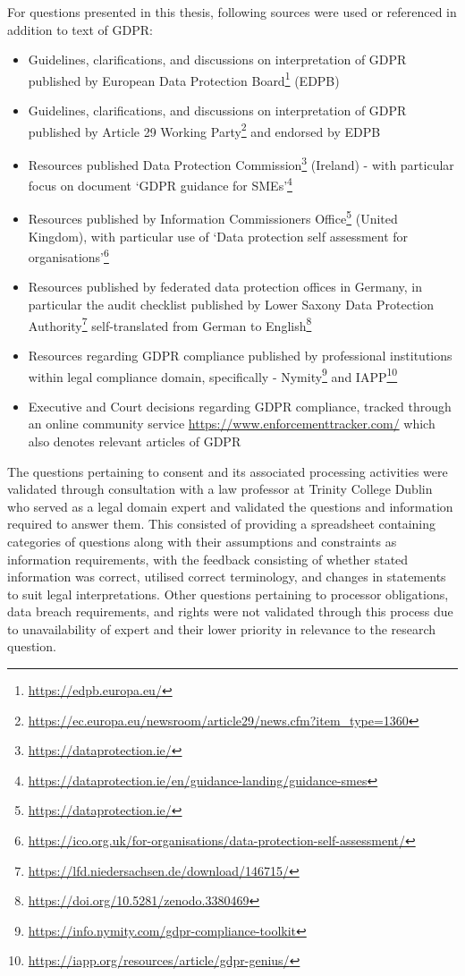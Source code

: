 For questions presented in this thesis, following sources were used or referenced in addition to text of GDPR:
\begin{itemize}
    \item Guidelines, clarifications, and discussions on interpretation of GDPR published by European Data Protection Board\footnote{\url{https://edpb.europa.eu/}} (EDPB)
    \item Guidelines, clarifications, and discussions on interpretation of GDPR published by Article 29 Working Party\footnote{\url{https://ec.europa.eu/newsroom/article29/news.cfm?item_type=1360}} and endorsed by EDPB
    \item Resources published Data Protection Commission\footnote{\url{https://dataprotection.ie/}} (Ireland) - with particular focus on document `GDPR guidance for SMEs'\footnote{\url{https://dataprotection.ie/en/guidance-landing/guidance-smes}}
    \item Resources published by Information Commissioners Office\footnote{\url{https://dataprotection.ie/}} (United Kingdom), with particular use of `Data protection self assessment for organisations'\footnote{\url{https://ico.org.uk/for-organisations/data-protection-self-assessment/}}
    \item Resources published by federated data protection offices in Germany, in particular the audit checklist published by Lower Saxony Data Protection Authority\footnote{\url{https://lfd.niedersachsen.de/download/146715/}} self-translated from German to English\footnote{\url{https://doi.org/10.5281/zenodo.3380469}}
    \item Resources regarding GDPR compliance published by professional institutions within legal compliance domain, specifically - Nymity\footnote{\url{https://info.nymity.com/gdpr-compliance-toolkit}} and IAPP\footnote{\url{https://iapp.org/resources/article/gdpr-genius/}}
    \item Executive and Court decisions regarding GDPR compliance, tracked through an online community service \url{https://www.enforcementtracker.com/} which also denotes relevant articles of GDPR
\end{itemize}

The questions pertaining to consent and its associated processing activities were validated through consultation with a law professor at Trinity College Dublin who served as a legal domain expert and validated the questions and information required to answer them. This consisted of providing a spreadsheet containing categories of questions along with their assumptions and constraints as information requirements, with the feedback consisting of whether stated information was correct, utilised correct terminology, and changes in statements to suit legal interpretations.
Other questions pertaining to processor obligations, data breach requirements, and rights were not validated through this process due to unavailability of expert and their lower priority in relevance to the research question.

